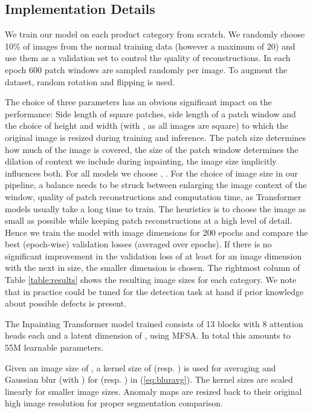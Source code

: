 \documentclass[runningheads]{llncs}
\begin{document}
\subsection{Implementation Details}
\label{seq:implementation_details}

We train our model on each product category from scratch. We randomly choose 10\% of images from the normal training data (however a maximum of 20) and use them as a validation set to control the quality of reconstructions. In each epoch 600 patch windows are sampled randomly per image. To augment the dataset, random rotation and flipping is used.

The choice of three parameters has an obvious significant impact on the performance: Side length  of square patches, side length  of a patch window and the choice of height  and width  (with , as all images are square) to which the original image is resized during training and inference. The patch size determines how much of the image is covered, the size of the patch window determines the dilation of context we include during inpainting, the image size implicitly influences both. For all models we choose , . For the choice of image size in our pipeline, a balance needs to be struck between enlarging the image context of the  window, quality of patch reconstructions and computation time, as Transformer models usually take a long time to train. The heuristics is to choose the image as small as possible while keeping patch reconstructions at a high level of detail. Hence we train the model with image dimensions  for 200 epochs and compare the best (epoch-wise) validation losses (averaged over  epochs). If there is no significant improvement in the validation loss of at least  for an image dimension with the next in size, the smaller dimension is chosen. The rightmost column of Table \ref{table:results} shows the resulting image sizes for each category. We note that in practice  could be tuned for the detection task at hand if prior knowledge about possible defects is present.

The Inpainting Transformer model trained consists of 13 blocks with 8 attention heads each and a latent dimension of , using MFSA. In total this amounts to 55M learnable parameters.

Given an image size of , a kernel size of  (resp. ) is used for averaging and Gaussian blur (with ) for  (resp. ) in (\ref{eq:bluravg}). The kernel sizes are scaled linearly for smaller image sizes. Anomaly maps are resized back to their original high image resolution for proper segmentation comparison.
\end{document}
